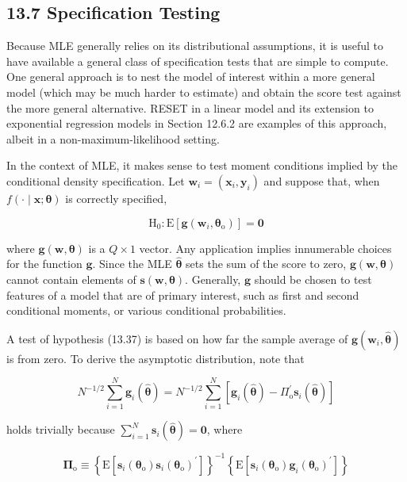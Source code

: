 \documentclass[10pt]{article}
\begin{document}
\subsection*{13.7 Specification Testing}
Because MLE generally relies on its distributional assumptions, it is useful to have available a general class of specification tests that are simple to compute. One general approach is to nest the model of interest within a more general model (which may be much harder to estimate) and obtain the score test against the more general alternative. RESET in a linear model and its extension to exponential regression models in Section 12.6.2 are examples of this approach, albeit in a non-maximum-likelihood setting.

In the context of MLE, it makes sense to test moment conditions implied by the conditional density specification. Let $\mathbf{w}_{i}=\left(\mathbf{x}_{i}, \mathbf{y}_{i}\right)$ and suppose that, when $f(\cdot \mid \mathbf{x} ; \boldsymbol{\theta})$ is correctly specified,


\begin{equation*}
\mathrm{H}_{0}: \mathrm{E}\left[\mathbf{g}\left(\mathbf{w}_{i}, \boldsymbol{\theta}_{\mathrm{o}}\right)\right]=\mathbf{0} \tag{13.37}
\end{equation*}


where $\mathbf{g}(\mathbf{w}, \boldsymbol{\theta})$ is a $Q \times 1$ vector. Any application implies innumerable choices for the function $\mathbf{g}$. Since the MLE $\hat{\boldsymbol{\theta}}$ sets the sum of the score to zero, $\mathbf{g}(\mathbf{w}, \boldsymbol{\theta})$ cannot contain elements of $\mathbf{s}(\mathbf{w}, \boldsymbol{\theta})$. Generally, $\mathbf{g}$ should be chosen to test features of a model that are of primary interest, such as first and second conditional moments, or various conditional probabilities.

A test of hypothesis (13.37) is based on how far the sample average of $\mathbf{g}\left(\mathbf{w}_{i}, \hat{\boldsymbol{\theta}}\right)$ is from zero. To derive the asymptotic distribution, note that

$$
N^{-1 / 2} \sum_{i=1}^{N} \mathbf{g}_{i}(\hat{\boldsymbol{\theta}})=N^{-1 / 2} \sum_{i=1}^{N}\left[\mathbf{g}_{i}(\hat{\boldsymbol{\theta}})-\Pi_{\mathrm{o}}^{\prime} \mathbf{s}_{i}(\hat{\boldsymbol{\theta}})\right]
$$

holds trivially because $\sum_{i=1}^{N} \mathbf{s}_{i}(\hat{\boldsymbol{\theta}})=\mathbf{0}$, where

$$
\boldsymbol{\Pi}_{\mathrm{o}} \equiv\left\{\mathrm{E}\left[\mathbf{s}_{i}\left(\boldsymbol{\theta}_{\mathrm{o}}\right) \mathbf{s}_{i}\left(\boldsymbol{\theta}_{\mathrm{o}}\right)^{\prime}\right]\right\}^{-1}\left\{\mathrm{E}\left[\mathbf{s}_{i}\left(\boldsymbol{\theta}_{\mathrm{o}}\right) \mathbf{g}_{i}\left(\boldsymbol{\theta}_{\mathrm{o}}\right)^{\prime}\right]\right\}
$$
\end{document}
